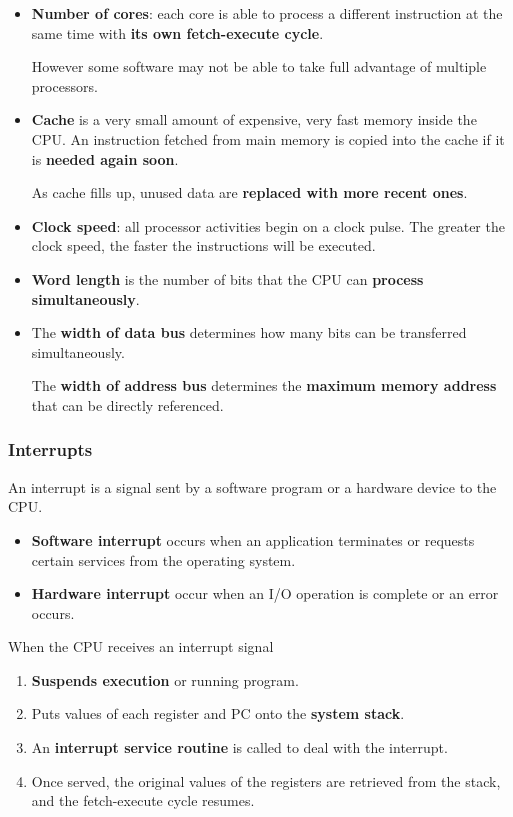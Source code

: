 \begin{itemize}
    \item \textbf{Number of cores}: each core is able to process a different instruction at the same time with \textbf{its own fetch-execute cycle}.

        However some software may not be able to take full advantage of multiple processors.
    \item \textbf{Cache} is a very small amount of expensive, very fast memory inside the CPU. An instruction fetched from main memory is copied into the cache if it is \textbf{needed again soon}.

        As cache fills up, unused data are \textbf{replaced with more recent ones}.
    \item \textbf{Clock speed}: all processor activities begin on a clock pulse. The greater the clock speed, the faster the instructions will be executed.
    \item \textbf{Word length} is the number of bits that the CPU can \textbf{process simultaneously}.
    \item The \textbf{width of data bus} determines how many bits can be transferred simultaneously.

        The \textbf{width of address bus} determines the \textbf{maximum memory address} that can be directly referenced.
\end{itemize}

\subsubsection*{Interrupts}

An interrupt is a signal sent by a software program or a hardware device to the CPU.
\begin{itemize}
    \item \textbf{Software interrupt} occurs when an application terminates or requests certain services from the operating system.
    \item \textbf{Hardware interrupt} occur when an I/O operation is complete or an error occurs.
\end{itemize}

When the CPU receives an interrupt signal
\begin{enumerate}
    \item \textbf{Suspends execution} or running program.
    \item Puts values of each register and PC onto the \textbf{system stack}.
    \item An \textbf{interrupt service routine} is called to deal with the interrupt.
    \item Once served, the original values of the registers are retrieved from the stack, and the fetch-execute cycle resumes.
\end{enumerate}
